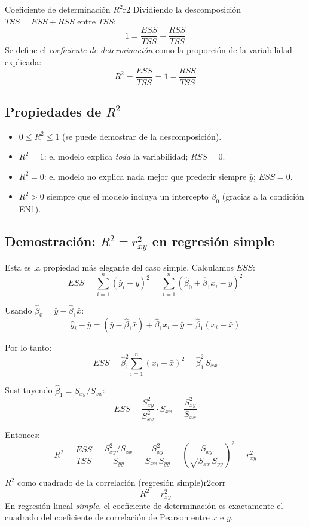 \documentclass[12pt, a4paper]{article}
\newcommand{\hbeta}{\hat{\beta}}
\newcommand{\hy}{\hat{y}}
\newcommand{\sxx}{S_{xx}}
\newcommand{\syy}{S_{yy}}
\newcommand{\sxy}{S_{xy}}
\newcommand{\sumni}{\sum_{i=1}^{n}}
\begin{document}
\begin{resultado}{Coeficiente de determinación $R^2$}{r2}
Dividiendo la descomposición $TSS = ESS + RSS$ entre $TSS$:
\[
  1 = \frac{ESS}{TSS} + \frac{RSS}{TSS}
\]
Se define el \emph{coeficiente de determinación} como la proporción de la
variabilidad explicada:
\[
  \boxed{
    R^2 = \frac{ESS}{TSS} = 1 - \frac{RSS}{TSS}
  }
\]
\end{resultado}

\subsection{Propiedades de $R^2$}

\begin{itemize}
  \item $0 \leq R^2 \leq 1$ (se puede demostrar de la descomposición).
  \item $R^2 = 1$: el modelo explica \emph{toda} la variabilidad; $RSS = 0$.
  \item $R^2 = 0$: el modelo no explica nada mejor que predecir siempre $\bar{y}$; $ESS = 0$.
  \item $R^2 > 0$ siempre que el modelo incluya un intercepto $\beta_0$
        (gracias a la condición EN1).
\end{itemize}

\subsection{Demostración: $R^2 = r_{xy}^2$ en regresión simple}

Esta es la propiedad más elegante del caso simple. Calculamos $ESS$:
\[
  ESS = \sumni(\hy_i - \bar{y})^2
      = \sumni(\hbeta_0 + \hbeta_1 x_i - \bar{y})^2
\]

Usando $\hbeta_0 = \bar{y} - \hbeta_1\bar{x}$:
\[
  \hy_i - \bar{y}
    = (\bar{y} - \hbeta_1\bar{x}) + \hbeta_1 x_i - \bar{y}
    = \hbeta_1(x_i - \bar{x})
\]

Por lo tanto:
\[
  ESS = \hbeta_1^2\sumni(x_i-\bar{x})^2 = \hbeta_1^2\,\sxx
\]

Sustituyendo $\hbeta_1 = \sxy/\sxx$:
\[
  ESS = \frac{\sxy^2}{\sxx^2}\cdot\sxx = \frac{\sxy^2}{\sxx}
\]

Entonces:
\[
  R^2
    = \frac{ESS}{TSS}
    = \frac{\sxy^2/\sxx}{\syy}
    = \frac{\sxy^2}{\sxx\,\syy}
    = \left(\frac{\sxy}{\sqrt{\sxx\,\syy}}\right)^{\!2}
    = r_{xy}^2
\]

\begin{resultado}{$R^2$ como cuadrado de la correlación (regresión simple)}{r2corr}
\[
  \boxed{R^2 = r_{xy}^2}
\]
En regresión lineal \emph{simple}, el coeficiente de determinación es
exactamente el cuadrado del coeficiente de correlación de Pearson entre
$x$ e $y$.
\end{resultado}
\end{document}
